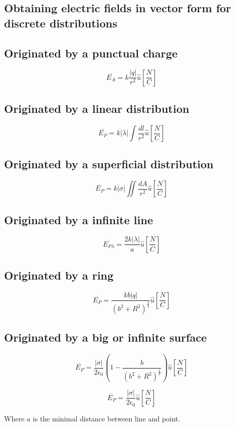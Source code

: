 \documentclass[letterpaper]{article}
\newcommand{\divline}{\noindent\makebox[\linewidth]{\rule{\textwidth}{0.4pt}}}
\begin{document}
    \divline
    \begin{multicols}{2}
        \section{Obtaining electric fields in vector form for discrete distributions}
        
        \subsection{Originated by a punctual charge}

        \[\overline{E_{A}} = k \frac{|q|}{r^{2}} \hat{u}  \left[ \frac{N}{C} \right] \]

        \subsection{Originated by a linear distribution}

        \[\overline{E_{P}} = k |\lambda| \int \frac{dl}{r^{2}} \hat{u} \left[ \frac{N}{C} \right] \]

        \subsection{Originated by a superficial distribution}

        \[ \overline{E_{P}} = k |\sigma| \iint \frac{dA}{r^{2}} \hat{u} \left[ \frac{N}{C} \right] \]

        \subsection{Originated by a infinite line}

        \[\overline{E_{P \lambda}} = \frac{2k|\lambda|}{a} \hat{u} \left[ \frac{N}{C} \right]\]

        \subsection{Originated by a ring}

        \[ \overline{E_{P}} =  \frac{kb|q|}{(b^{2}+R^{2})^{\frac{3}{2}}}  \hat{u} \left[ \frac{N}{C} \right] \]

        \subsection{Originated by a big or infinite surface}

        \[ \overline{E_{P}} = \frac{|\sigma|}{2\epsilon_{0}} \left( 1 - \frac{b}{(b^{2} + R^{2})^{\frac{1}{2}}} \right)  \hat{u} \left[ \frac{N}{C} \right] \]

        \[ \overline{E_{P}} = \frac{|\sigma|}{2\epsilon_{0}} \hat{u} \left[ \frac{N}{C} \right] \]

        Where \(a\) is the minimal distance between line and point.
    \end{multicols}
\end{document}
